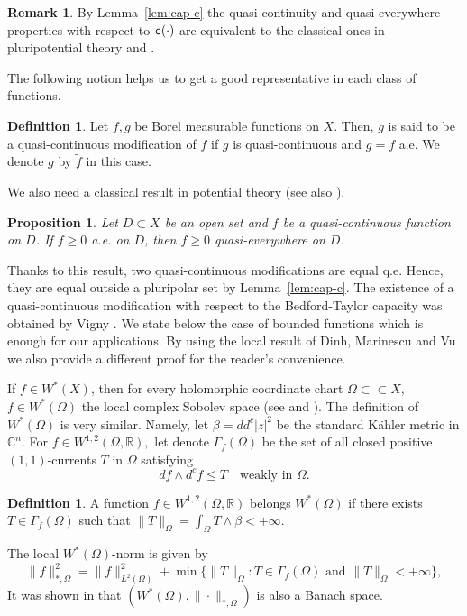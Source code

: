 \documentclass{amsart}
\newcommand{\wt}[1]{\widetilde{#1}}
\newcommand{\be}{\beta}
\newcommand{\tc}{{\tt c}}
\newcommand{\Ga}{\Gamma}
\newcommand{\Om}{\Omega}
\newcommand{\bR}{\mathbb{R}}
\newcommand{\bC}{\mathbb{C}}
\newtheorem{prop}[thm]{Proposition}
\theoremstyle{definition}
\newtheorem{defn}[thm]{Definition}
\newtheorem{remark}[thm]{Remark}
\numberwithin{thm}{section}
\numberwithin{equation}{section}
\renewcommand{\[}{\begin{equation}}
\renewcommand{\]}{\end{equation}}
\newcommand{\wed}{\wedge}
\begin{document}
\begin{remark} By Lemma~\ref{lem:cap-c}  the quasi-continuity and quasi-everywhere properties with respect to $\tc (\cdot)$ are equivalent to the classical ones  in pluripotential theory \cite{BT82, BT87} and \cite{GZ-book}.
\end{remark}

The following notion helps us to get a good representative in each class of functions.

\begin{defn}
Let $f,g$ be Borel measurable functions on $X$. Then,  $g$ is said to be a quasi-continuous modification of $f$ if $g$ is quasi-continuous and $g= f$ a.e. We denote $g$ by $\wt f$ in this case.
\end{defn}

We also need a classical result in potential theory \cite[Lemma~2.14]{FOT94} (see also \cite[Propositon~21]{Vigny}). 
\begin{prop} \label{prop:ae-qe}  Let $D\subset X$ be an open set and $f$ be a quasi-continuous function on $D$. If $f\geq 0$ a.e. on $D$, then $f\geq 0$  quasi-everywhere on  $D$.
\end{prop}

Thanks to this result, two quasi-continuous modifications are equal q.e. Hence, they are equal outside a pluripolar set by Lemma~\ref{lem:cap-c}. The existence of a quasi-continuous modification with respect to the Bedford-Taylor capacity was obtained by  Vigny \cite[Theorem~22]{Vigny}.  We state below the case of bounded functions which is enough for our applications.  By using the local result of Dinh, Marinescu and Vu \cite{DMV} we also provide  a different proof for the reader's convenience.

If $f \in W^*(X)$, then for every holomorphic coordinate chart $\Om \subset \subset X$, $f \in W^*(\Om)$ the local complex Sobolev space (see \cite{DMV} and \cite{Vigny}). The definition of $W^*(\Om)$ is very similar. Namely,  let $\be = dd^c |z|^2$ be the standard K\"ahler metric in $\bC^n$. For $f\in W^{1,2}(\Om,\bR),$ let denote $\Ga_f(\Om)$ be the set of all closed positive $(1,1)$-currents $T$ in $\Om$ satisfying
 \[\label{eq:w-ineq-loc}
	df \wed d^c f  \leq T \quad\text{weakly in } \Om.
\]


\begin{defn}\label{defn:w-local}
A function $f\in W^{1,2}(\Om,\bR)$  belongs $W^*(\Om)$ if   there exists $T \in \Ga_f (\Om)$ such that $\|T\|_\Om = \int_\Om T \wed \be <+\infty$. \end{defn}
The local $W^*(\Om)$-norm is given by
\[\label{eq:w-norm-loc}
	\|f\|_{*,\Om}^2 = \|f\|_{L^2(\Om)}^2 + \min\{\|T\|_\Om : T \in \Ga_f(\Om) \text{ and } \|T\|_\Om <+\infty\},
\]
It was shown in \cite[Proposition~1]{Vigny} that $(W^*(\Om), \|\cdot\|_{*,\Om})$ is also a Banach space. 
\end{document}
